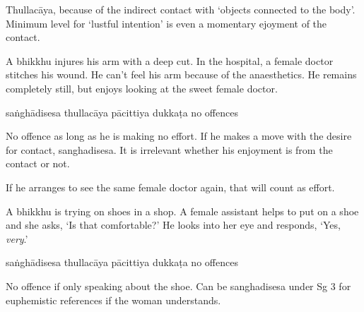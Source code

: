 \begin{exam}{\autoExamName}
\begin{problem*}
\begin{parts}
    \begin{solution}
      Thullacāya, because of the indirect contact with `objects connected to the body'.
      Minimum level for `lustful intention' is even a momentary ejoyment of the contact.
    \end{solution}

    \bigskip

  \item A bhikkhu injures his arm with a deep cut. In the hospital, a female
    doctor stitches his wound. He can't feel his arm because of the
    anaesthetics. He remains completely still, but enjoys looking at the sweet female doctor.

    \bigskip

    \begin{answers}{5}
      \bChoices
       saṅghādisesa\eAns
       thullacāya\eAns
       pācittiya\eAns
       dukkaṭa\eAns
       no offences\eAns
      \eChoices
    \end{answers}

    \begin{solution}
      No offence as long as he is making no effort.
      If he makes a move with the desire for contact, sanghadisesa.
      It is irrelevant whether his enjoyment is from the contact or not.

      If he arranges to see the same female doctor again, that will count as effort.
    \end{solution}

    \bigskip

  \item A bhikkhu is trying on shoes in a shop. A female assistant helps to put
    on a shoe and she asks, `Is that comfortable?' He looks into her eye and
    responds, `Yes, \textit{very}.'

    \bigskip

    \begin{answers}{5}
      \bChoices
       saṅghādisesa\eAns
       thullacāya\eAns
       pācittiya\eAns
       dukkaṭa\eAns
       no offences\eAns
      \eChoices
    \end{answers}

  \bigskip

  \begin{solution}
    No offence if only speaking about the shoe.
    Can be sanghadisesa under Sg 3 for euphemistic references if the woman understands.
  \end{solution}


\end{parts}
\end{problem*}
\end{exam}

